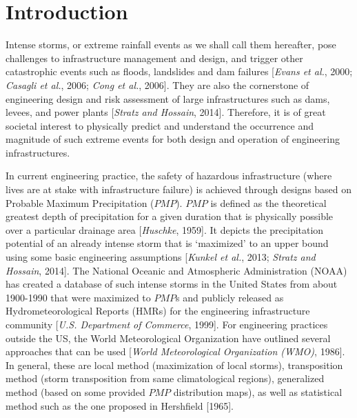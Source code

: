 \vspace{20mm}

\section{Introduction}
 
Intense storms, or extreme rainfall events as we shall call them hereafter, pose challenges to infrastructure management and design, and trigger other catastrophic events such as floods, landslides and dam failures [\textit{Evans et al.}, 2000; \textit{Casagli et al.}, 2006; \textit{Cong et al.}, 2006]. They are also the cornerstone of engineering design and risk assessment of large infrastructures such as dams, levees, and power plants [\textit{Stratz and Hossain}, 2014]. Therefore, it is of great societal interest to physically predict and understand the occurrence and magnitude of such extreme events for both design and operation of engineering infrastructures.

In current engineering practice, the safety of hazardous infrastructure (where lives are at stake with infrastructure failure) is achieved through designs based on Probable Maximum Precipitation ($PMP$). $PMP$ is defined as the theoretical greatest depth of precipitation for a given duration that is physically possible over a particular drainage area [\textit{Huschke}, 1959]. It depicts the precipitation potential of an already intense storm that is ‘maximized’ to an upper bound using some basic engineering assumptions [\textit{Kunkel et al.}, 2013; \textit{Stratz and Hossain}, 2014]. The National Oceanic and Atmospheric Administration (NOAA) has created a database of such intense storms in the United States from about 1900-1990 that were maximized to $PMP$s and publicly released as Hydrometeorological Reports (HMRs) for the engineering infrastructure community [\textit{U.S. Department of Commerce}, 1999]. For engineering practices outside the US, the World Meteorological Organization have outlined several approaches that can be used [\textit{World Meteorological Organization (WMO)}, 1986]. In general, these are local method (maximization of local storms), transposition method (storm transposition from same climatological regions), generalized method (based on some provided $PMP$ distribution maps), as well as statistical method such as the one proposed in Hershfield [1965].

